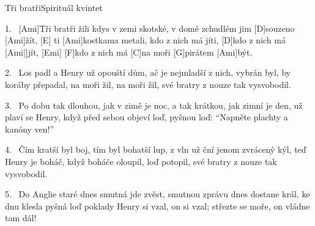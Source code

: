 \begin{song}{Tři bratři}{Spirituál kvintet}

\begin{xverse}{1.~}
[Ami]Tři bratři žili kdys v zemi skotské,
v domě zchudlém jim [D]souzeno [Ami]{žít}, [E]{}
ti [Ami]kostkama metali, kdo z nich má jíti,
[D]kdo z nich má [Ami|]{jít,} [Emi]{}
[F]kdo z nich má [C]na moři [G]pirátem [Ami]být.
\end{xverse}


\begin{xverse}{2.~}
Los padl a Henry už opouští dům,
ač je nejmladší z nich, vybrán byl,
by koráby přepadal, na moři žil,
na moři žil,
své bratry z nouze tak vysvobodil.
\end{xverse}


\begin{xverse}{3.~}
Po dobu tak dlouhou, jak v zimě je noc,
a tak krátkou, jak zimní je den,
už plaví se Henry, když před sebou objeví
loď, pyšnou loď:
``Napněte plachty a kanóny ven!''
\end{xverse}


\begin{xverse}{4.~}
Čím kratší byl boj, tím byl bohatší lup,
z vln už ční jenom zvrácený kýl,
teď Henry je boháč, když boháče oloupil,
loď potopil,
své bratry z nouze tak vysvobodil.
\end{xverse}


\begin{xverse}{5.~}
Do Anglie staré dnes smutná jde zvěst,
smutnou zprávu dnes dostane král,
ke dnu klesla pyšná loď poklady Henry si
vzal, on si vzal;
střezte se moře, on vládne tam dál!
\end{xverse}
\end{song}

